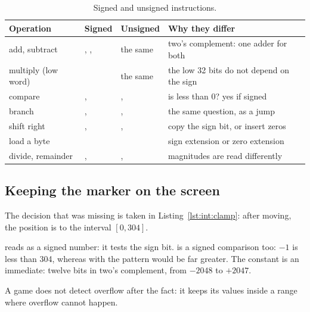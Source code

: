 \begin{table}[htb]
\centering\small
\caption{Signed and unsigned instructions.}\label{tab:int:signed}
\begin{tabularx}{\textwidth}{@{}lllL@{}}
\toprule
\textbf{Operation} & \textbf{Signed} & \textbf{Unsigned} & \textbf{Why they differ}\\
\midrule
add, subtract & , ,  & the same & two's complement: one adder for both\\
multiply (low word) &  & the same & the low 32 bits do not depend on the sign\\
compare & ,  & ,  & is  less than 0? yes if signed\\
branch & ,  & ,  & the same question, as a jump\\
shift right & ,  & ,  & copy the sign bit, or insert zeros\\
load a byte &  &  & sign extension or zero extension\\
divide, remainder & ,  & ,  & magnitudes are read differently\\
\bottomrule
\end{tabularx}
\end{table}

\subsection{Keeping the marker on the screen}

The decision that was missing is taken in Listing~\ref{lst:int:clamp}: after
moving, the position is  to the interval $[0, 304]$.


 reads  as a signed number: it tests the sign bit.
 is a signed comparison too: $-1$ is less than 304, whereas with
 the pattern  would be far greater. The constant
 is an immediate: twelve bits in two's complement, from $-2048$
to $+2047$.

\begin{prgconcept}
A game does not detect overflow after the fact: it keeps its values inside a
range where overflow cannot happen.
\end{prgconcept}

